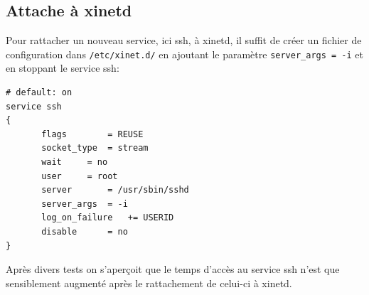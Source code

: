 \documentclass[12pt,a4paper,notitlepage]{article}
\begin{document}
\subsection{Attache à xinetd}

Pour rattacher un nouveau service, ici ssh, à xinetd, il suffit de créer un fichier de configuration dans \texttt{/etc/xinet.d/} en ajoutant le paramètre \texttt{server\_args = -i} et en stoppant le service ssh: \\

\begin{lstlisting}
# default: on
service ssh
{
       flags		= REUSE
       socket_type	= stream
       wait		= no
       user		= root
       server		= /usr/sbin/sshd
       server_args	= -i
       log_on_failure	+= USERID
       disable		= no
}
\end{lstlisting}

Après divers tests on s'aperçoit que le temps d'accès au service ssh n'est que sensiblement augmenté après le rattachement de celui-ci à xinetd.
\end{document}
